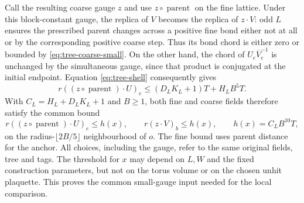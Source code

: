 Call the resulting coarse gauge $z$ and use $z\circ\operatorname{parent}$
on the fine lattice. Under this block-constant gauge, the replica
of $V$ becomes the replica of $z\cdot V$: odd $L$ ensures the
prescribed parent changes across a positive fine bond either not at
all or by the corresponding positive coarse step. Thus its bond
chord is either zero or bounded by \eqref{eq:tree-coarse-small}.
On the other hand, the chord of $U_e\overline V_e^{-1}$ is unchanged
by the simultaneous gauge, since that product is conjugated at the
initial endpoint. Equation \eqref{eq:tree-shell} consequently gives
\[
 r((z\circ\operatorname{parent})\cdot U)_e
       \le(D_LK_L+1)T+H_LB^5T.
\]
With $C_L=H_L+D_LK_L+1$ and $B\ge1$, both fine and coarse fields
therefore satisfy the common bound
\begin{equation}\label{eq:tree-common-gauge}
 r((z\circ\operatorname{parent})\cdot U)_e\le h(x),\qquad
 r(z\cdot V)_b\le h(x),\qquad h(x)=C_LB^{10}T,
\end{equation}
on the radius-$\lfloor2B/5\rfloor$ neighbourhood of $o$.
The fine bound uses parent distance for the anchor. All choices,
including the gauge, refer to the same original fields, tree and
tags. The threshold for $x$ may depend on $L,W$ and the fixed
construction parameters, but not on the torus volume or on the
chosen unhit plaquette. This proves the common small-gauge input
needed for the local comparison.
